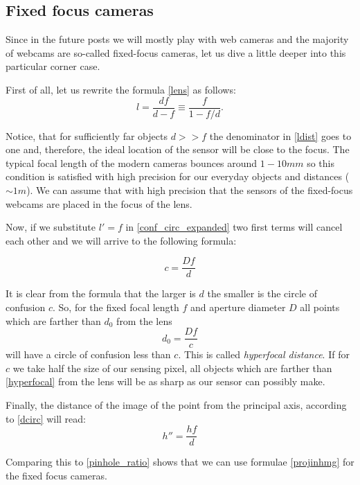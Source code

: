 \documentclass[a4paper,10pt]{article}
\begin{document}
\subsection{Fixed focus cameras}

Since in the future posts we will mostly play with web cameras and the majority of webcams are so-called fixed-focus cameras, let us dive a little deeper into this particular corner case.

First of all, let us rewrite the formula \eqref{lens} as follows:
\begin{equation}
l=\frac{df}{d-f}\equiv\frac{f}{1 - f/d}.\label{ldist}
\end{equation}

Notice, that for sufficiently far objects $d >> f$ the denominator in \eqref{ldist} goes to one and, therefore, the ideal location of the sensor will be close to the focus. The typical focal length of the modern cameras bounces around $1-10 mm$ so this condition is satisfied with high precision for our everyday objects and distances ($\sim 1m$). We can assume that with high precision that the sensors of the fixed-focus webcams are placed in the focus of the lens. 

Now, if we substitute $l'=f$ in \eqref{conf_circ_expanded} two first terms will cancel each other and we will arrive to the following formula:

\begin{equation}
c=\frac{Df}{d}
\end{equation}

It is clear from the formula that the larger is $d$ the smaller is the circle of confusion $c$. So, for the fixed focal length $f$ and aperture diameter $D$ all points which are farther than $d_0$ from the lens
\begin{equation}
d_0 = \frac{Df}{c} \label{hyperfocal}
\end{equation}
will have a circle of confusion less than $c$. This is called {\it hyperfocal distance}. If for $c$ we take half the  size of our sensing pixel, all objects which are farther than \eqref{hyperfocal} from the lens will be as sharp as our sensor can possibly make. 

Finally, the distance of the image of the point from the principal axis, according to \eqref{dcirc} will read:
\begin{equation}
h'' = \frac{hf}{d}
\end{equation}

Comparing this to \eqref{pinhole_ratio} shows that we can use formulae  \eqref{projinhmg} for the fixed focus cameras.
\end{document}
